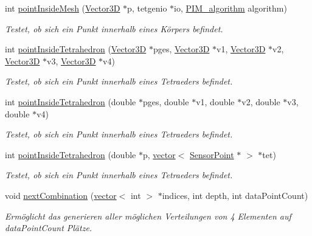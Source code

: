\begin{DoxyCompactItemize}
int \hyperlink{namespaceUtils_af8fc5d6dab27f759ab5d76757a53023f}{point\-Inside\-Mesh} (\hyperlink{classVector3D}{Vector3\-D} $\ast$p, tetgenio $\ast$io, \hyperlink{namespaceUtils_ad369b0127cabda0d6871ce1ae7e6c862}{P\-I\-M\-\_\-algorithm} algorithm)
\begin{DoxyCompactList}\small\item\em Testet, ob sich ein Punkt innerhalb eines Körpers befindet. \end{DoxyCompactList}\item 
int \hyperlink{namespaceUtils_a9b995a1220a78be108b19bda4b776332}{point\-Inside\-Tetrahedron} (\hyperlink{classVector3D}{Vector3\-D} $\ast$pges, \hyperlink{classVector3D}{Vector3\-D} $\ast$v1, \hyperlink{classVector3D}{Vector3\-D} $\ast$v2, \hyperlink{classVector3D}{Vector3\-D} $\ast$v3, \hyperlink{classVector3D}{Vector3\-D} $\ast$v4)
\begin{DoxyCompactList}\small\item\em Testet, ob sich ein Punkt innerhalb eines Tetraeders befindet. \end{DoxyCompactList}\item 
int \hyperlink{namespaceUtils_a8f7379e1915d2a04907eb9d99d0a56ad}{point\-Inside\-Tetrahedron} (double $\ast$pges, double $\ast$v1, double $\ast$v2, double $\ast$v3, double $\ast$v4)
\begin{DoxyCompactList}\small\item\em Testet, ob sich ein Punkt innerhalb eines Tetraeders befindet. \end{DoxyCompactList}\item 
int \hyperlink{namespaceUtils_a40eaef4d22da849a5deb2f1153d88bbc}{point\-Inside\-Tetrahedron} (double $\ast$p, \hyperlink{classstd_1_1vector}{vector}$<$ \hyperlink{structUtils_1_1SensorPoint}{Sensor\-Point} $\ast$ $>$ $\ast$tet)
\begin{DoxyCompactList}\small\item\em Testet, ob sich ein Punkt innerhalb eines Tetraeders befindet. \end{DoxyCompactList}\item 
void \hyperlink{namespaceUtils_af4ba26e928c7cef5269c51bfac49d547}{next\-Combination} (\hyperlink{classstd_1_1vector}{vector}$<$ int $>$ $\ast$indices, int depth, int data\-Point\-Count)
\begin{DoxyCompactList}\small\item\em Ermöglicht das generieren aller möglichen Verteilungen von 4 Elementen auf data\-Point\-Count Plätze. \end{DoxyCompactList}\item 

\end{DoxyCompactItemize}
